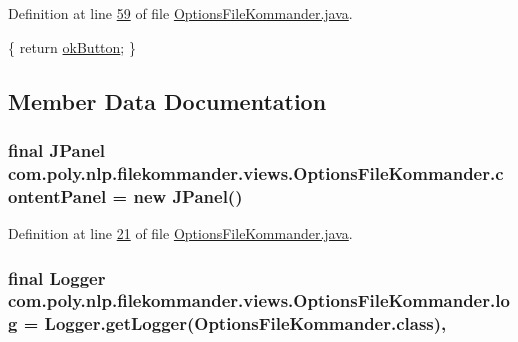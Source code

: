 Definition at line \hyperlink{L59}{59} of file \hyperlink{}{Options\-File\-Kommander.\-java}.


\begin{DoxyCode}
                                 \{
        \textcolor{keywordflow}{return} \hyperlink{classcom_1_1poly_1_1nlp_1_1filekommander_1_1views_1_1_options_file_kommander_a0f8aef931bc85b51505210be4fbc87e1}{okButton};
    \}
\end{DoxyCode}


\subsection{Member Data Documentation}
\hypertarget{classcom_1_1poly_1_1nlp_1_1filekommander_1_1views_1_1_options_file_kommander_a566cf729d42553b326dc4eaaf52cd9d8}{
\subsubsection[{content\-Panel}]{\setlength{\rightskip}{0pt plus 5cm}final J\-Panel com.\-poly.\-nlp.\-filekommander.\-views.\-Options\-File\-Kommander.\-content\-Panel = new J\-Panel()\hspace{0.3cm}{\ttfamily [private]}}}\label{classcom_1_1poly_1_1nlp_1_1filekommander_1_1views_1_1_options_file_kommander_a566cf729d42553b326dc4eaaf52cd9d8}


Definition at line \hyperlink{L21}{21} of file \hyperlink{}{Options\-File\-Kommander.\-java}.

\hypertarget{classcom_1_1poly_1_1nlp_1_1filekommander_1_1views_1_1_options_file_kommander_aaf488bac9983e9c54d0470f623d038a9}{
\subsubsection[{log}]{\setlength{\rightskip}{0pt plus 5cm}final Logger com.\-poly.\-nlp.\-filekommander.\-views.\-Options\-File\-Kommander.\-log = Logger.\-get\-Logger(Options\-File\-Kommander.\-class)\hspace{0.3cm}{\ttfamily [static]}, {\ttfamily [private]}}}\label{classcom_1_1poly_1_1nlp_1_1filekommander_1_1views_1_1_options_file_kommander_aaf488bac9983e9c54d0470f623d038a9}


